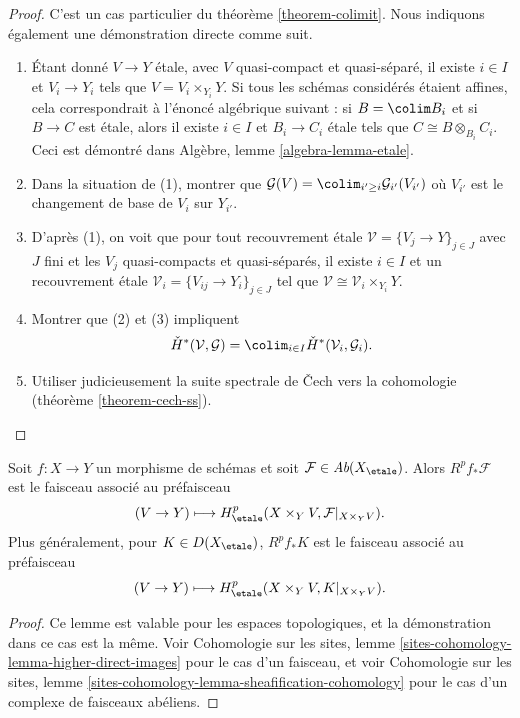 \begin{proof}
C'est un cas particulier du th\'eor\`eme \ref{theorem-colimit}.
Nous indiquons \'egalement une d\'emonstration directe comme suit.
\begin{enumerate}
\item \'Etant donn\'e $V \to Y$ \'etale, avec $V$ quasi-compact et
quasi-s\'epar\'e, il existe $i\in I$ et $V_i \to Y_i$ tels que
$V = V_i \times_{Y_i} Y$.
Si tous les sch\'emas consid\'er\'es \'etaient affines, cela correspondrait \`a
l'\'enonc\'e alg\'ebrique suivant : si $B = \colim B_i$ et si $B \to C$ est \'etale,
alors il existe $i \in I$ et $B_i \to C_i$ \'etale tels que
$C \cong B \otimes_{B_i} C_i$.
Ceci est d\'emontr\'e dans Alg\`ebre, lemme \ref{algebra-lemma-etale}.
\item Dans la situation de (1), montrer que
$\mathcal{G}(V) = \colim_{i' \geq i} \mathcal{G}_{i'}(V_{i'})$
o\`u $V_{i'}$ est le changement de base de $V_i$ sur $Y_{i'}$.
\item D'apr\`es (1), on voit que pour tout recouvrement \'etale
$\mathcal{V} = \{V_j \to Y\}_{j\in J}$ avec $J$ fini et les
$V_j$ quasi-compacts et quasi-s\'epar\'es, il existe $i \in I$ et
un recouvrement \'etale $\mathcal{V}_i = \{V_{ij} \to Y_i\}_{j \in J}$
tel que $\mathcal{V} \cong \mathcal{V}_i \times_{Y_i} Y$.
\item Montrer que (2) et (3) impliquent
$$
\check H^*(\mathcal{V}, \mathcal{G})=
\colim_{i\in I} \check H^*(\mathcal{V}_i, \mathcal{G}_i).
$$
\item Utiliser judicieusement la suite spectrale de {\v C}ech vers la cohomologie
(th\'eor\`eme \ref{theorem-cech-ss}).
\end{enumerate}
\end{proof}

\begin{lemma}
\label{lemma-higher-direct-images}
Soit $f: X\to Y$ un morphisme de sch\'emas et soit $\mathcal{F}\in
\textit{Ab}(X_\etale)$. Alors $R^pf_*\mathcal{F}$ est le faisceau
associ\'e au pr\'efaisceau
$$
(V \to Y) \longmapsto H_\etale^p(X \times_Y V, \mathcal{F}|_{X \times_Y V}).
$$
Plus g\'en\'eralement, pour $K \in D(X_\etale)$, $R^pf_*K$ est le
faisceau associ\'e au pr\'efaisceau
$$
(V \to Y) \longmapsto H_\etale^p(X \times_Y V, K|_{X \times_Y V}).
$$
\end{lemma}

\begin{proof}
Ce lemme est valable pour les espaces topologiques, et la d\'emonstration dans ce cas est la
m\^eme. Voir Cohomologie sur les sites, lemme
\ref{sites-cohomology-lemma-higher-direct-images}
pour le cas d'un faisceau, et voir
Cohomologie sur les sites, lemme
\ref{sites-cohomology-lemma-sheafification-cohomology}
pour le cas d'un complexe de faisceaux ab\'eliens.
\end{proof}

